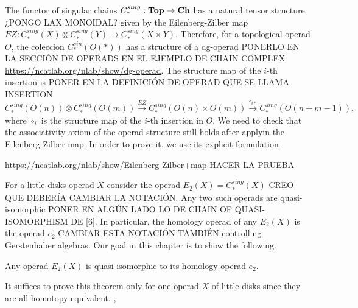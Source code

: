 \documentclass[TFM.tex]{subfiles}
\begin{document}
The functor of singular chains $C_*^{sing}:\mathrm{\mathbf{Top}}\to \mathrm{\mathbf{Ch}}$ has a natural tensor structure ¿PONGO LAX MONOIDAL? given by the Eilenberg-Zilber map $EZ:C_*^{sing}(X)\otimes C_*^{sing}(Y)\to C_*^{sing}(X\times Y)$. Therefore, for a topological operad $O$, the coleccion $C_*^{sin}(O(*))$ has a structure of a dg-operad PONERLO EN LA SECCIÓN DE OPERADS EN EL EJEMPLO DE CHAIN COMPLEX \url{https://ncatlab.org/nlab/show/dg-operad}. The structure map of the $i$-th insertion is PONER EN LA DEFINICIÓN DE OPERAD QUE SE LLAMA INSERTION
\[
C_*^{sing}(O(n))\otimes C_*^{sing}(O(m))\xrightarrow{EZ} C_*^{sing}(O(n)\times O(m))\xrightarrow{\circ_{i*}} C_*^{sing}(O(n+m-1)),
\]
where $\circ_i$ is the structure map of the $i$-th insertion in $O$. We need to check that the associativity axiom of the operad structure still holds after applyin the Eilenberg-Zilber map. In order to prove it, we use its explicit formulation \cite{EZ}

\url{https://ncatlab.org/nlab/show/Eilenberg-Zilber+map}
HACER LA PRUEBA 

For a little disks operad $X$ consider the operad $E_2(X)=C_*^{sing}(X)$ CREO QUE DEBERÍA CAMBIAR LA NOTACIÓN. Any two such operads are quasi-isomorphic PONER EN ALGÚN LADO LO DE CHAIN OF QUASI-ISOMORPHISM DE [6]. In particular, the homology operad of any $E_2(X)$ is the operad $e_2$ CAMBIAR ESTA NOTACIÓN TAMBIÉN controlling Gerstenhaber algebras. Our goal in this chapter is to show the following.

\begin{thm}
Any operad $E_2(X)$ is quasi-isomorphic to its homology operad $e_2$.
\end{thm}

It suffices to prove this theorem only for one operad $X$ of little disks since they are all homotopy equivalent. , 
\end{document}

